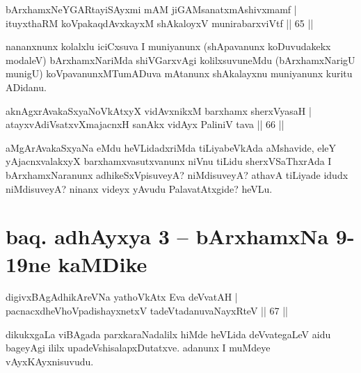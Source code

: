 
\begin{shl}
bArxhamxNeYGARtayiSAyxmi mAM jiGAMsanatxmAshivxmamf |\\
ituyxthaRM koVpakaqdAvxkayxM shAkaloyxV munirabarxviVtf \hfill || 65 ||
\end{shl}

\begin{artha}
nananxnunx kolalxlu iciCxsuva I muniyanunx (shApavanunx koDuvudakekx modaleV) bArxhamxNariMda shiVGarxvAgi kolilxsuvuneMdu (bArxhamxNarigU munigU) koVpavanunxMTumADuva mAtanunx shAkalayxnu muniyanunx kuritu ADidanu.
\end{artha}


\begin{shl}
\footnotetext[1]{}aknAgxrAvakaSxyaNoVkAtxyX vidAvxnikxM barxhamx sherxVyasaH |\\
atayxvAdiVsatxvXmajacnxH sanAkx vidAyx PaliniV tava \hfill || 66 ||
\end{shl}

\begin{artha}
aMgArAvakaSxyaNa eMdu heVLidadxriMda tiLiyabeVkAda aMshavide, eleY yAjacnxvalakxyX barxhamxvasutxvanunx niVnu tiLidu sherxVSaThxrAda I bArxhamxNaranunx adhikeSxVpisuveyA? niMdisuveyA? athavA tiLiyade idudx niMdisuveyA? ninanx videyx yAvudu PalavatAtxgide? heVLu.
\end{artha}

\section*{baq. adhAyxya 3 -- bArxhamxNa 9-19ne kaMDike}


\begin{shl}
digivxBAgAdhikAreVNa yathoVkAtx Eva deVvatAH |\\
pacnacxdheVhoVpadishayxnetxV tadeVtadanuvaNayxRteV \hfill || 67 ||
\end{shl}

\begin{artha}
dikukxgaLa viBAgada parxkaraNadalilx hiMde heVLida deVvategaLeV aidu bageyAgi ililx upadeVshisalapxDutatxve. adanunx I muMdeye vAyxKAyxnisuvudu.
\end{artha}


